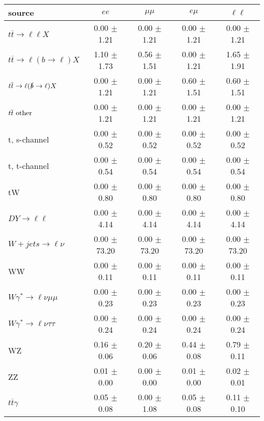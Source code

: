\begin{tabular}{l|cccc} \hline\hline
source & $ee$ & $\mu\mu$ & $e\mu$ & $\ell\ell $ \\
\hline
$t\overline{t} \rightarrow \ell \ell X$ &  0.00 $\pm$  1.21 &  0.00 $\pm$  1.21 &  0.00 $\pm$  1.21 &  0.00 $\pm$  1.21 \\
$t\overline{t} \rightarrow \ell (b \rightarrow \ell) X$ &  1.10 $\pm$  1.73 &  0.56 $\pm$  1.51 &  0.00 $\pm$  1.21 &  1.65 $\pm$  1.91 \\
$t\overline{t} \rightarrow \ell (\slashed b \rightarrow \ell) X$ &  0.00 $\pm$  1.21 &  0.00 $\pm$  1.21 &  0.60 $\pm$  1.51 &  0.60 $\pm$  1.51 \\
        $t\overline{t}\ \rm{other}$ &  0.00 $\pm$  1.21 &  0.00 $\pm$  1.21 &  0.00 $\pm$  1.21 &  0.00 $\pm$  1.21 \\
\hline
                       t, s-channel &  0.00 $\pm$  0.52 &  0.00 $\pm$  0.52 &  0.00 $\pm$  0.52 &  0.00 $\pm$  0.52 \\
                       t, t-channel &  0.00 $\pm$  0.54 &  0.00 $\pm$  0.54 &  0.00 $\pm$  0.54 &  0.00 $\pm$  0.54 \\
                                 tW &  0.00 $\pm$  0.80 &  0.00 $\pm$  0.80 &  0.00 $\pm$  0.80 &  0.00 $\pm$  0.80 \\
\hline
         $DY \rightarrow \ell \ell$ &  0.00 $\pm$  4.14 &  0.00 $\pm$  4.14 &  0.00 $\pm$  4.14 &  0.00 $\pm$  4.14 \\
      $W+jets \rightarrow \ell \nu$ &  0.00 $\pm$ 73.20 &  0.00 $\pm$ 73.20 &  0.00 $\pm$ 73.20 &  0.00 $\pm$ 73.20 \\
                                 WW &  0.00 $\pm$  0.11 &  0.00 $\pm$  0.11 &  0.00 $\pm$  0.11 &  0.00 $\pm$  0.11 \\
\hline
$W\gamma^{*} \rightarrow \ell \nu \mu\mu$ &  0.00 $\pm$  0.23 &  0.00 $\pm$  0.23 &  0.00 $\pm$  0.23 &  0.00 $\pm$  0.23 \\
$W\gamma^{*} \rightarrow \ell \nu \tau\tau$ &  0.00 $\pm$  0.24 &  0.00 $\pm$  0.24 &  0.00 $\pm$  0.24 &  0.00 $\pm$  0.24 \\
                                 WZ &  0.16 $\pm$  0.06 &  0.20 $\pm$  0.06 &  0.44 $\pm$  0.08 &  0.79 $\pm$  0.11 \\
                                 ZZ &  0.01 $\pm$  0.00 &  0.00 $\pm$  0.00 &  0.01 $\pm$  0.00 &  0.02 $\pm$  0.01 \\
\hline
              $t\overline{t}\gamma$ &  0.05 $\pm$  0.08 &  0.00 $\pm$  1.08 &  0.05 $\pm$  0.08 &  0.11 $\pm$  0.10 \\

\end{tabular}
